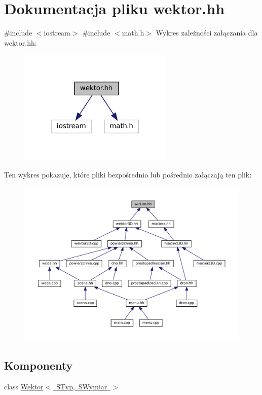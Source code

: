 \hypertarget{wektor_8hh}{}\section{Dokumentacja pliku wektor.\+hh}
\label{wektor_8hh}
{\ttfamily \#include $<$iostream$>$}\newline
{\ttfamily \#include $<$math.\+h$>$}\newline
Wykres zależności załączania dla wektor.\+hh\+:\nopagebreak
\begin{figure}[H]
\begin{center}
\leavevmode
\includegraphics[width=210pt]{wektor_8hh__incl}
\end{center}
\end{figure}
Ten wykres pokazuje, które pliki bezpośrednio lub pośrednio załączają ten plik\+:
\nopagebreak
\begin{figure}[H]
\begin{center}
\leavevmode
\includegraphics[width=350pt]{wektor_8hh__dep__incl}
\end{center}
\end{figure}
\subsection*{Komponenty}
\begin{DoxyCompactItemize}
\item 
class \mbox{\hyperlink{class_wektor}{Wektor$<$ S\+Typ, S\+Wymiar $>$}}
\end{DoxyCompactItemize}
